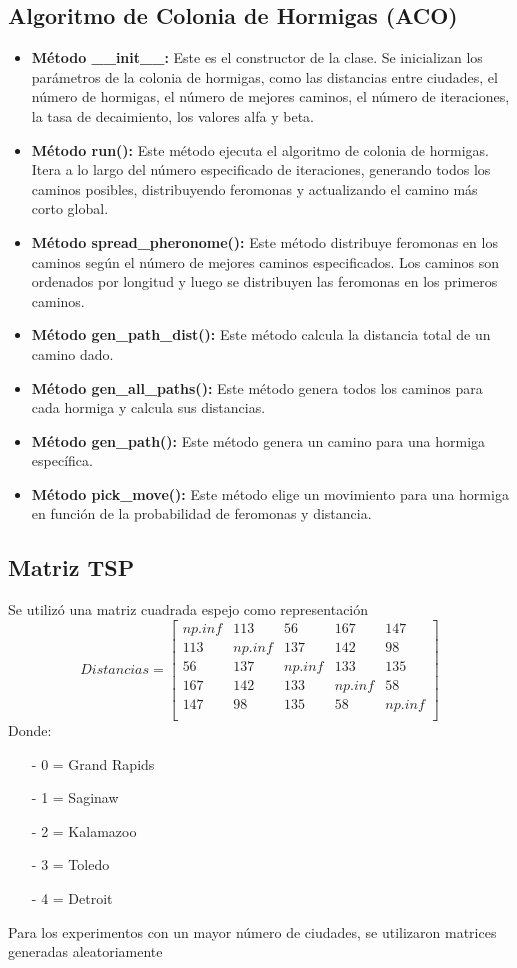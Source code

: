 \documentclass[]{report}
\begin{document}
	\subsection{Algoritmo de Colonia de Hormigas (ACO)}
	\begin{itemize}
		\item \textbf{Método \_\_init\_\_:} Este es el constructor de la clase. Se inicializan los parámetros de la colonia de hormigas, como las distancias entre ciudades, el número de hormigas, el número de mejores caminos, el número de iteraciones, la tasa de decaimiento, los valores alfa y beta.
		\item \textbf{Método run():} Este método ejecuta el algoritmo de colonia de hormigas. Itera a lo largo del número especificado de iteraciones, generando todos los caminos posibles, distribuyendo feromonas y actualizando el camino más corto global.
		\item \textbf{Método spread\_pheronome():} Este método distribuye feromonas en los caminos según el número de mejores caminos especificados. Los caminos son ordenados por longitud y luego se distribuyen las feromonas en los primeros caminos.
		\item \textbf{Método gen\_path\_dist():} Este método calcula la distancia total de un camino dado.
		\item \textbf{Método gen\_all\_paths():} Este método genera todos los caminos para cada hormiga y calcula sus distancias.
		\item \textbf{Método gen\_path():} Este método genera un camino para una hormiga específica.
		\item \textbf{Método pick\_move():} Este método elige un movimiento para una hormiga en función de la probabilidad de feromonas y distancia.
	\end{itemize}
	\subsection{Matriz TSP}
	Se utilizó una matriz cuadrada espejo como representación\\
	\[
	Distancias =
	\begin{bmatrix}
		np.inf&113&56&167&147\\
		113&np.inf&137&142&98\\
		56&137&np.inf&133&135\\
		167&142&133&np.inf&58\\
		147&98&135&58&np.inf\\
	\end{bmatrix}
	\]
	Donde:
	\begin{itemize}
		\item[-]0 = Grand Rapids
		\item[-]1 = Saginaw
		\item[-]2 = Kalamazoo
		\item[-]3 = Toledo
		\item[-]4 = Detroit

	\end{itemize}
	Para los experimentos con un mayor número de ciudades, se utilizaron matrices generadas aleatoriamente
	
\end{document}
